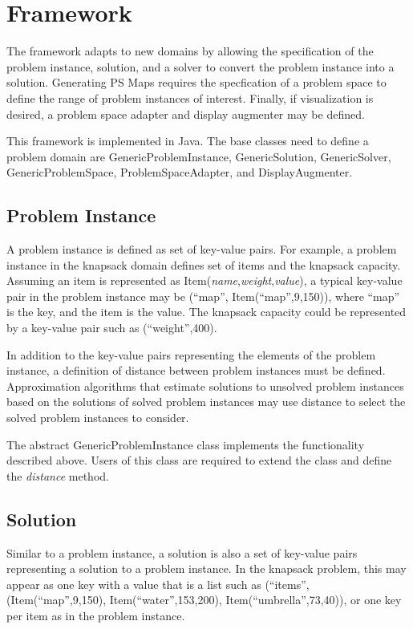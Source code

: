 \chapter{Framework}
\thispagestyle{plain}

\label{ch:framework}

The framework adapts to new domains by allowing the specification of the problem instance, solution, and a solver to convert the problem instance into a solution.  Generating PS Maps requires the specfication of a problem space to define the range of problem instances of interest.  Finally, if visualization is desired, a problem space adapter and display augmenter may be defined.

This framework is implemented in Java.  The base classes need to define a problem domain are GenericProblemInstance, GenericSolution, GenericSolver, GenericProblemSpace, ProblemSpaceAdapter, and DisplayAugmenter.

\section{Problem Instance}

A problem instance is defined as set of key-value pairs.  For example, a problem instance in the knapsack domain defines set of items and the knapsack capacity.  Assuming an item is represented as Item(\textit{name},\textit{weight},\textit{value}), a typical key-value pair in the problem instance may be (``map'', Item(``map'',9,150)), where ``map'' is the key, and the item is the value.  The knapsack capacity could be represented by a key-value pair such as (``weight'',400).

In addition to the key-value pairs representing the elements of the problem instance, a definition of distance between problem instances must be defined.  Approximation algorithms that estimate solutions to unsolved problem instances based on the solutions of solved problem instances may use distance to select the solved problem instances to consider.

The abstract GenericProblemInstance class implements the functionality described above.  Users of this class are required to extend the class and define the \textit{distance} method.

\section{Solution}

Similar to a problem instance, a solution is also a set of key-value pairs representing a solution to a problem instance.  In the knapsack problem, this may appear as one key with a value that is a list such as (``items'', (Item(``map'',9,150), Item(``water'',153,200), Item(``umbrella'',73,40)), or one key per item as in the problem instance.

